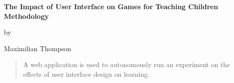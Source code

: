 \documentclass[12pt]{article}
\begin{document}
	
\sloppy

%


%
\newcommand{\brk}{\vspace*{0.18in}}

\thispagestyle{empty}

\begin{center}

\brk


   {\large 
	\textbf{
	 The Impact of User Interface on Games for Teaching Children Methodology
	}
   }


\brk
by

\brk
Maximilian Thompson

\end{center}

\newpage

%
\doublespacing


\begin{abstract}
A web application is used to autonomously run an experiment on the effects of user interface design on learning.
\end{abstract}



\clearpage
\end{document}
